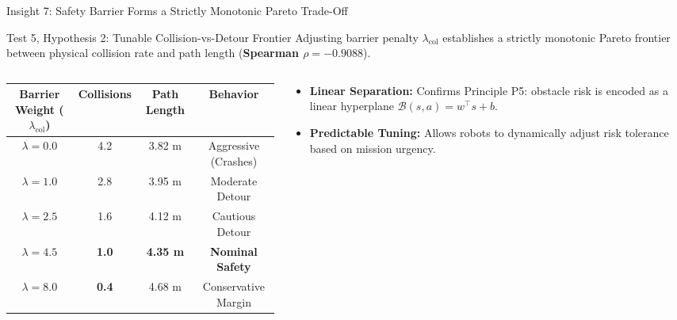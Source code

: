 \documentclass[aspectratio=169, 10pt]{beamer}
\begin{document}
\begin{frame}{Insight 7: Safety Barrier Forms a Strictly Monotonic Pareto Trade-Off}
  \begin{block}{Test 5, Hypothesis 2: Tunable Collision-vs-Detour Frontier}
    Adjusting barrier penalty $\lambda_{\text{col}}$ establishes a strictly monotonic Pareto frontier between physical collision rate and path length (\textbf{Spearman $\rho = -0.9088$}).
  \end{block}
  \vspace{-0.2cm}
  \begin{columns}[T]
    \begin{column}{0.52\textwidth}
      \setlength{\tabcolsep}{3pt}
      \begin{table}
        \centering
        \scriptsize
        \begin{tabular}{cccc}
          \toprule
          \textbf{Barrier Weight ($\lambda_{\text{col}}$)} & \textbf{Collisions} & \textbf{Path Length} & \textbf{Behavior} \\
          \midrule
          $\lambda = 0.0$ & 4.2 & 3.82 m & Aggressive (Crashes) \\
          $\lambda = 1.0$ & 2.8 & 3.95 m & Moderate Detour \\
          $\lambda = 2.5$ & 1.6 & 4.12 m & Cautious Detour \\
          $\lambda = 4.5$ & \textbf{1.0} & \textbf{4.35 m} & \textbf{Nominal Safety} \\
          $\lambda = 8.0$ & \textbf{0.4} & 4.68 m & Conservative Margin \\
          \bottomrule
        \end{tabular}
      \end{table}
    \end{column}
    \begin{column}{0.46\textwidth}
      \begin{itemize}
        \item \textbf{Linear Separation:} Confirms Principle P5: obstacle risk is encoded as a linear hyperplane $\mathcal{B}(s, a) = w^\top s + b$.
        \item \textbf{Predictable Tuning:} Allows robots to dynamically adjust risk tolerance based on mission urgency.
      \end{itemize}
    \end{column}
  \end{columns}
\end{frame}
\end{document}
